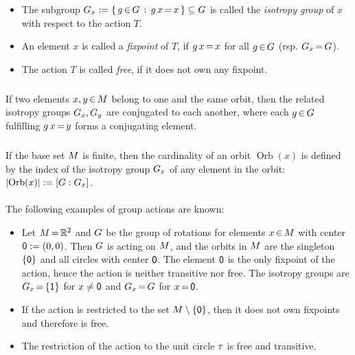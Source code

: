 \documentclass[11pt,twoside]{article}
\begin{document}
\begin{itemize}[leftmargin=15pt]
\item[1.]
The subgroup
$G_x := \{ \, g {\,\in\,} G \,: \, g\,x {\,=\,} x \, \} \subseteq G$ is called
the \textit{isotropy group} of $x$ with respect to the action $T$.

\item[2.]
An element $x$ is called a \textit{fixpoint} of $T$,
if $g \, x {\,=\,} x$ for all $g {\,\in\,} G$
(rsp. $G_x {\,=\,} G$).

\item[3.]
The action $T$ is called \textit{free},
if it does not own any fixpoint.
\end{itemize}

\subparagraph{}
If two elements $x,y {\,\in\,} M$ belong to one and the same orbit,
then the related isotropy groups $G_x,G_y$
are conjugated to each another,
where each $g {\,\in\,} G$ fulfilling $g\,x {\,=\,} y$
forms a conjugating element.

\subparagraph{}
If the base set $M$ is finite,
then the cardinality of an orbit $\operatorname{Orb}(x)$
is defined by the index of the isotropy group
$G_x$ of any element in the orbit:
$\abs{\operatorname{Orb}(x) } := [\grpG:\grpG_x]$.

\paragraph{}
The following examples of group actions are known:

\begin{itemize}[leftmargin=15pt]
\item[1.]
Let $M {\,=\,} {\mathbb{R}}^2$ and $G$ be the group of rotations
for elements $x {\,\in\,} M$ with center ${\mathsf{0}} := (0,0)$.
Then $G$ is acting on $M$,
and the orbits in $M$ are the singleton $\{{\mathsf{0}}\}$
and all circles with center ${\mathsf{0}}$.
The element ${\mathsf{0}}$ is the only fixpoint of the action,
hence the action is neither transitive nor free.
The isotropy groups are $G_x {\,=\,} \{ {\mathsf{1}} \}$
for $x \neq {\mathsf{0}}$ and $G_x {\,=\,} G$ for $x {\,=\,} {\mathsf{0}}$.

\item[2.]
If the action is restricted to the set $M \setminus \{{\mathsf{0}}\}$,
then it does not own fixpoints and therefore is free.

\item[3.]
The restriction of the action to the unit circle $\tau$
is free and transitive.
\end{itemize}

\end{document}
